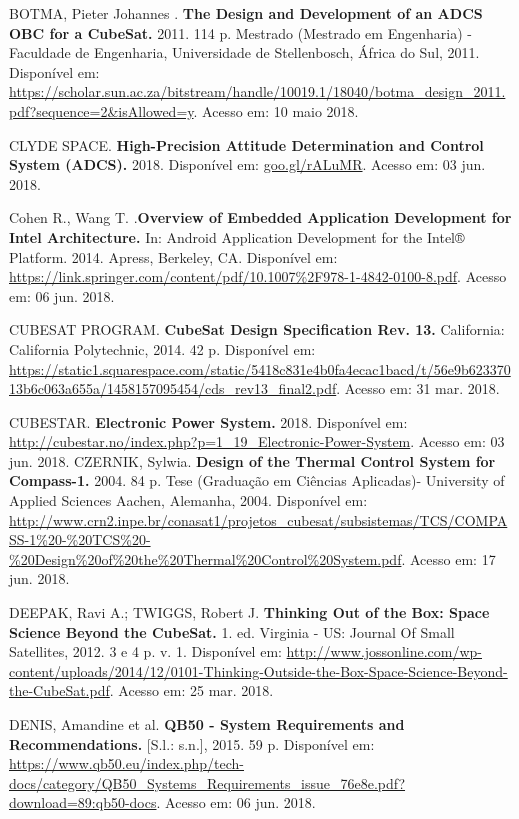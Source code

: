 \noindent BOTMA, Pieter Johannes . \textbf{The Design and Development of an ADCS OBC for a CubeSat. } 2011. 114 p. Mestrado (Mestrado em Engenharia) - Faculdade de Engenharia, Universidade de Stellenbosch, África do Sul, 2011. Disponível em: \url{https://scholar.sun.ac.za/bitstream/handle/10019.1/18040/botma_design_2011.pdf?sequence=2&isAllowed=y}. Acesso em: 10 maio 2018.

\noindent CLYDE SPACE. \textbf{High-Precision Attitude Determination and Control System (ADCS). } 2018. Disponível em: \url{goo.gl/rALuMR}. Acesso em: 03 jun. 2018.

\noindent Cohen R., Wang T. .\textbf{Overview of Embedded Application Development for Intel Architecture.} In: Android Application Development for the Intel® Platform. 2014. Apress, Berkeley, CA. Disponível em: \url{https://link.springer.com/content/pdf/10.1007\%2F978-1-4842-0100-8.pdf}. Acesso em: 06 jun. 2018.

\noindent CUBESAT PROGRAM. \textbf{CubeSat Design Specification Rev. 13. } California: California Polytechnic, 2014. 42 p. Disponível em: \url{https://static1.squarespace.com/static/5418c831e4b0fa4ecac1bacd/t/56e9b62337013b6c063a655a/1458157095454/cds_rev13_final2.pdf}. Acesso em: 31 mar. 2018.

\noindent CUBESTAR. \textbf{Electronic Power System. } 2018. Disponível em: \url{http://cubestar.no/index.php?p=1_19_Electronic-Power-System}. Acesso em: 03 jun. 2018.
\noindent CZERNIK, Sylwia. \textbf{Design of the Thermal Control System for Compass-1. } 2004. 84 p. Tese (Graduação em Ciências Aplicadas)- University of Applied Sciences Aachen, Alemanha, 2004. Disponível em: \url{http://www.crn2.inpe.br/conasat1/projetos_cubesat/subsistemas/TCS/COMPASS-1\%20-\%20TCS\%20-\%20Design\%20of\%20the\%20Thermal\%20Control\%20System.pdf}. Acesso em: 17 jun. 2018.

\noindent DEEPAK, Ravi A.; TWIGGS, Robert J. \textbf{Thinking Out of the Box: Space Science Beyond the CubeSat. } 1. ed. Virginia - US: Journal Of Small Satellites, 2012. 3 e 4 p. v. 1. Disponível em: \url{http://www.jossonline.com/wp-content/uploads/2014/12/0101-Thinking-Outside-the-Box-Space-Science-Beyond-the-CubeSat.pdf}. Acesso em: 25 mar. 2018.

\noindent DENIS, Amandine et al. \textbf{QB50 - System Requirements and Recommendations.} [S.l.: s.n.], 2015. 59 p. Disponível em: \url{ https://www.qb50.eu/index.php/tech-docs/category/QB50_Systems_Requirements_issue_76e8e.pdf?download=89:qb50-docs}. Acesso em: 06 jun. 2018.

